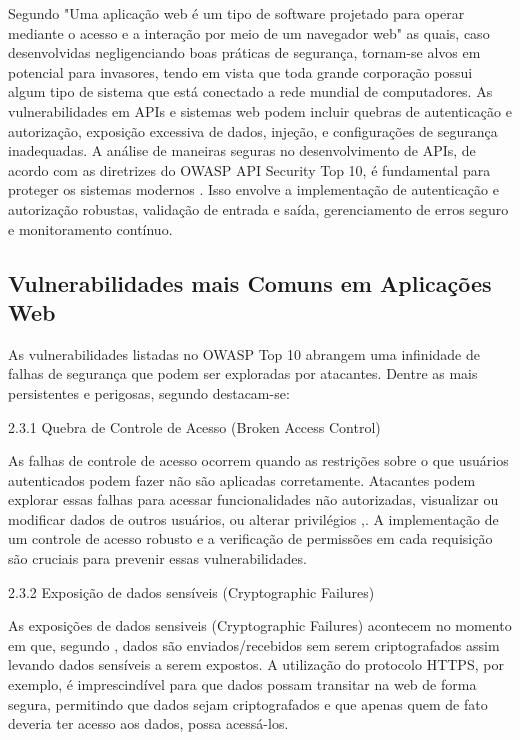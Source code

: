 \documentclass[12pt]{article}
\begin{document}
Segundo \textcite{leite2022} "Uma aplicação web é um tipo de software projetado para operar mediante o acesso e a interação por meio de um navegador web" 
as quais, caso desenvolvidas negligenciando boas práticas de segurança, tornam-se alvos em potencial para invasores, tendo em vista que toda grande 
corporação possui algum tipo de sistema que está conectado a rede mundial de computadores.
As vulnerabilidades em APIs e sistemas web podem incluir quebras de autenticação e autorização, exposição excessiva de dados, injeção, e configurações de segurança 
inadequadas. A análise de maneiras seguras no desenvolvimento de APIs, de acordo com as diretrizes do OWASP API Security Top 10, é fundamental para proteger os 
sistemas modernos . Isso envolve a implementação de autenticação e autorização robustas, validação de entrada e saída, gerenciamento de erros seguro e monitoramento contínuo.


\subsection{Vulnerabilidades mais Comuns em Aplicações Web}
As vulnerabilidades listadas no OWASP Top 10 abrangem uma infinidade de falhas de segurança que podem ser exploradas por atacantes. 
Dentre as mais persistentes e perigosas, segundo \textcite{owasp10} destacam-se:


2.3.1 Quebra de Controle de Acesso (Broken Access Control)

As falhas de controle de acesso ocorrem quando as restrições sobre o que usuários autenticados podem fazer não são aplicadas corretamente. 
Atacantes podem explorar essas falhas para acessar funcionalidades não autorizadas, visualizar ou modificar dados de outros usuários, ou alterar privilégios 
,\cite{Matthew2020}. A implementação de um controle de acesso robusto e a verificação de permissões em cada requisição são cruciais para prevenir essas vulnerabilidades.

2.3.2 Exposição de dados sensíveis (Cryptographic Failures)

As exposições de dados sensiveis (Cryptographic Failures) acontecem no momento em que, segundo \textcite{joseph2024}, dados são enviados/recebidos sem serem criptografados
 assim levando dados sensíveis a serem expostos.
A utilização do protocolo HTTPS, por exemplo, é imprescindível para que dados possam transitar na web de forma segura, permitindo que dados sejam criptografados e que apenas
 quem de fato deveria ter acesso aos dados, possa acessá-los.
\end{document}
